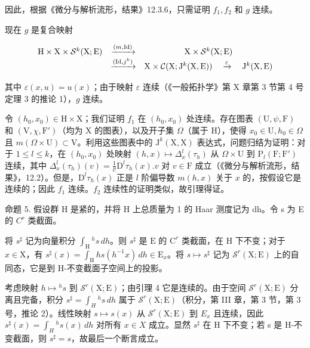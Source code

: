 因此，根据《微分与解析流形，结果》12.3.6，只需证明 \(f_{1}, f_{2}\) 和 \(g\) 连续。

现在 \(g\) 是复合映射

\[
\begin{array}{c c c} \mathrm{H} \times \mathrm{X} \times \mathcal {S} ^ {k} (\mathrm{X}; \mathrm{E}) & \xrightarrow {(m , \mathrm{Id})} & \mathrm{X} \times \mathcal {S} ^ {k} (\mathrm{X}; \mathrm{E}) \\ & \xrightarrow {(\mathrm{Id} , j ^ {k})} & \mathrm{X} \times \mathcal {C} (\mathrm{X}; \mathrm{J} ^ {k} (\mathrm{X}, \mathrm{E})) \quad \xrightarrow {\varepsilon} \quad \mathrm{J} ^ {k} (\mathrm{X}, \mathrm{E}) \end{array}
\]

其中 \(\varepsilon(x, u) = u(x)\)；由于映射 \(\varepsilon\) 连续（《一般拓扑学》第 X 章第 3 节第 4 号定理 3 的推论 1），\(g\) 连续。

令 \((h_{0}, x_{0}) \in \mathrm{H} \times \mathrm{X}\)；我们证明 \(f_{1}\) 在 \((h_{0}, x_{0})\) 处连续。存在图表 \((\mathrm{U}, \psi, \mathrm{F})\) 和 \((\mathrm{V}, \chi, \mathrm{F}')\)（均为 \(\mathrm{X}\) 的图表），以及开子集 \(\Omega\)（属于 \(\mathrm{H}\)），使得 \(x_{0} \in \mathrm{U}, h_{0} \in \Omega\) 且 \(m(\Omega \times \mathrm{U}) \subset \mathrm{V}\)。利用这些图表中的 \(\mathrm{J}^{k}(\mathrm{X}, \mathrm{X})\) 表达式，问题归结为证明：对于 \(1 \leq l \leq k\)，在 \((h_{0}, x_{0})\) 处映射 \((h, x) \mapsto \Delta_{x}^{l}(\tau_{h})\) 从 \(\Omega \times \mathrm{U}\) 到 \(\mathrm{P}_{l}(\mathrm{F}; \mathrm{F}')\) 连续，其中 \(\Delta_{x}^{l}(\tau_{h})(v) = \frac{1}{l!}\mathrm{D}^{l}\tau_{h}(x).v\) 对 \(v \in \mathrm{F}\) 成立（《微分与解析流形，结果》，12.2）。但是，\(\mathrm{D}^{l}\tau_{h}(x)\) 正是 \(l\) 阶偏导数 \(m(h, x)\) 关于 \(x\) 的，按假设它是连续的；因此 \(f_{1}\) 连续。\(f_{2}\) 连续性的证明类似，故引理得证。

命题 5. 假设群 H 是紧的，并将 H 上总质量为 1 的 Haar 测度记为 dh。令 s 为 E 的 \(C^{r}\) 类截面。

将 \(s^{\sharp}\) 记为向量积分 \(\int_{\mathrm{H}}{}^{h}s\,dh\)。则 \(s^{\sharp}\) 是 \(\mathrm{E}\) 的 \(\mathrm{C}^r\) 类截面，在 \(\mathrm{H}\) 下不变；对于 \(x \in \mathrm{X}\)，有 \(s^{\sharp}(x) = \int_{\mathrm{H}}hs(h^{-1}x)\,dh \in \mathrm{E}_x\)。将 \(s \mapsto s^{\sharp}\) 记为 \(\mathcal{S}^r(\mathrm{X};\mathrm{E})\) 上的自同态，它是到 H-不变截面子空间上的投影。

考虑映射 \(h \mapsto {}^{h}s\) 到 \(\mathcal{S}^{r}(\mathrm{X};\mathrm{E})\)；由引理 4 它是连续的。由于空间 \(\mathcal{S}^{r}(\mathrm{X};\mathrm{E})\) 分离且完备，积分 \(s^{\sharp} = \int_{H}{}^{h}s\,dh\) 属于 \(\mathcal{S}^{r}(\mathrm{X};\mathrm{E})\)（积分，第 III 章，第 3 节，第 3 号，推论 2）。线性映射 \(s \mapsto s(x)\) 从 \(\mathcal{S}^{r}(\mathrm{X};\mathrm{E})\) 到 \(E_{x}\) 且连续，因此 \(s^{\sharp}(x) = \int_{H}{}^{h}s(x)\,dh\) 对所有 \(x \in X\) 成立。显然 \(s^{\sharp}\) 在 H 下不变；若 s 是 H-不变截面，则 \(s^{\sharp} = s\)，故最后一个断言成立。

